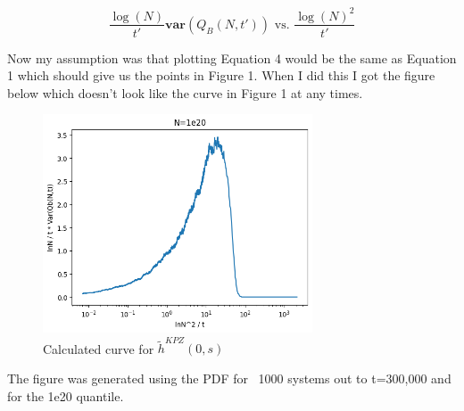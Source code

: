 \documentclass{article}
\begin{document}
\begin{equation}
\frac{\log(N)}{t'}\textbf{var}(Q_{B}(N, t'))  \textrm{ vs. }  \frac{\log(N)^{2}}{t'}
\end{equation}

Now my assumption was that plotting Equation 4 would be the same as Equation 1 which should give us the points in Figure 1. When I did this I got the figure below which doesn't look like the curve in Figure 1 at any times.

\begin{figure}[h]
\centering
\includegraphics[width=8cm]{KPZVar1e20}
\caption{Calculated curve for $\tilde{h}^{KPZ}(0, s)$}
\end{figure}

The figure was generated using the PDF for ~1000 systems out to t=300,000 and for the 1e20 quantile.
\end{document}

